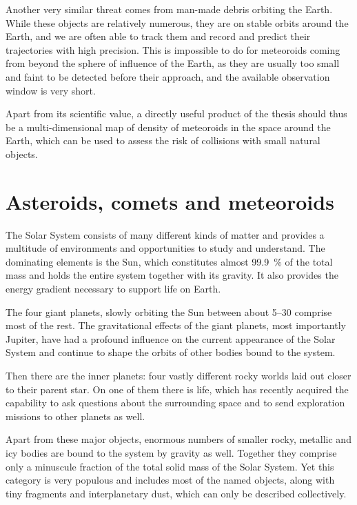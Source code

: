     Another very similar threat comes from man-made debris orbiting the Earth.
    While these objects are relatively numerous, they are on stable orbits around
    the Earth, and we are often able to track them and record and predict their trajectories with high precision.
    This is impossible to do for meteoroids coming from beyond the sphere of influence of the Earth,
    as they are usually too small and faint to be detected before their approach,
    and the available observation window is very short.

    Apart from its scientific value, a directly useful product of the thesis should thus
    be a multi-dimensional map of density of meteoroids in the space around the Earth,
    which can be used to assess the risk of collisions with small natural objects.

\section{Asteroids, comets and meteoroids} \label{ia}
    The Solar System consists of many different kinds of matter and provides a multitude
    of environments and opportunities to study and understand.
    The dominating elements is the Sun, which constitutes almost \SI{99.9}{\percent} of the total mass
    and holds the entire system together with its gravity.
    It also provides the energy gradient necessary to support life on Earth.

    The four giant planets, slowly orbiting the Sun between about \SIrange[range-phrase = {\ and\ }]{5}{30}{\au}
    comprise most of the rest. The gravitational effects of the giant planets, most importantly Jupiter,
    have had a profound influence on the current appearance of the Solar System and continue to
    shape the orbits of other bodies bound to the system.

    Then there are the inner planets: four vastly different rocky worlds laid out closer to their parent star.
    On one of them there is life, which has recently acquired the capability to ask questions about the surrounding
    space and to send exploration missions to other planets as well.

    Apart from these major objects, enormous numbers of smaller rocky, metallic and icy
    bodies are bound to the system by gravity as well. Together they comprise only a minuscule
    fraction of the total solid mass of the Solar System. Yet this category is very populous
    and includes most of the named objects, along with tiny fragments and interplanetary dust,
    which can only be described collectively.

